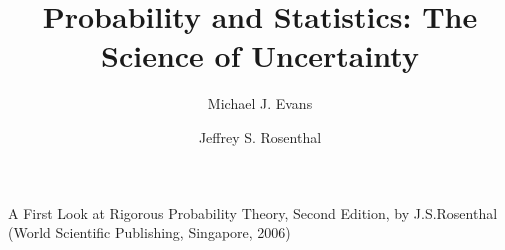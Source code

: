 \documentclass[a4paper]{book}
\title{Probability and Statistics: The Science of Uncertainty}
\author{Michael J. Evans \and Jeffrey S. Rosenthal}
\begin{document}
\maketitle
\dominitoc

\frontmatter
\tableofcontents



\mainmatter














\appendix
\begin{appendices}





\end{appendices}

\printindex

\begin{thebibliography}{99}
    A First Look at Rigorous Probability Theory, Second Edition, by J.S.Rosenthal (World Scientific
    Publishing, Singapore, 2006)
\end{thebibliography}
\end{document}
